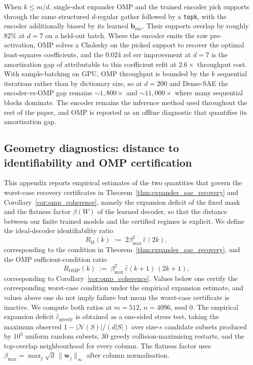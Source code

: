 \documentclass{article}
\theoremstyle{plain}
\theoremstyle{definition}
\theoremstyle{remark}
\begin{document}
When $k \le m/d$, single-shot expander OMP and the trained encoder pick supports through the same structured $d$-regular gather followed by a \texttt{topk}, with the encoder additionally biased by its learned $\mathbf{b}_{\mathrm{enc}}$. Their supports overlap by roughly $82\%$ at $d{=}7$ on a held-out batch. Where the encoder emits the raw pre-activation, OMP solves a Cholesky on the picked support to recover the optimal least-squares coefficients, and the $0.024$ rel err improvement at $d{=}7$ is the amortisation gap of \citet{oneill2025amortisation} attributable to this coefficient refit at $2.6\times$ throughput cost. With sample-batching on GPU, OMP throughput is bounded by the $k$ sequential iterations rather than by dictionary size, so at $d{=}200$ and Dense-SAE the encoder-vs-OMP gap remains $\sim\!1{,}800\times$ and $\sim\!11{,}000\times$ where many sequential blocks dominate. The encoder remains the inference method used throughout the rest of the paper, and OMP is reported as an offline diagnostic that quantifies its amortisation gap.

\subsection{Geometry diagnostics: distance to identifiability and OMP certification}
\label{app:bench_geometry}

This appendix reports empirical estimates of the two quantities that govern the worst-case recovery certificates in Theorem~\ref{thm:expander_sae_recovery} and Corollary~\ref{cor:omp_coherence}, namely the expansion deficit of the fixed mask and the flatness factor $\beta(W)$ of the learned decoder, so that the distance between our finite trained models and the certified regimes is explicit. We define the ideal-decoder identifiability ratio
\[
    R_{\mathrm{id}}(k)
    \;:=\;
    2\beta_{\max}^2\,\widehat\varepsilon(2k),
\]
corresponding to the condition in Theorem~\ref{thm:expander_sae_recovery}, and the OMP sufficient-condition ratio
\[
    R_{\mathrm{OMP}}(k)
    \;:=\;
    \beta_{\max}^2\,\widehat\varepsilon(k+1)\,(2k+1),
\]
corresponding to Corollary~\ref{cor:omp_coherence}. Values below one certify the corresponding worst-case condition under the empirical expansion estimate, and values above one do not imply failure but mean the worst-case certificate is inactive. We compute both ratios at $m{=}512$, $n{=}4096$, seed 0. The empirical expansion deficit $\widehat{\varepsilon}_{\mathrm{greedy}}$ is obtained as a one-sided stress test, taking the maximum observed $1 - |\mathcal{N}(S)|/(d|S|)$ over size-$s$ candidate subsets produced by $10^3$ uniform random subsets, $30$ greedy collision-maximising restarts, and the top-overlap neighbourhood for every column. The flatness factor uses $\beta_{\max} = \max_j \sqrt{d}\,\|\mathbf{w}_j\|_\infty$ after column normalisation.
\end{document}
